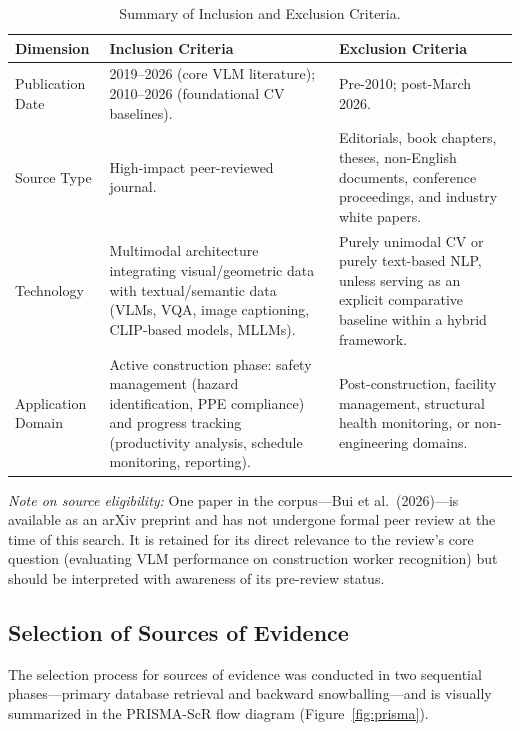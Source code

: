 \documentclass[10pt,letterpaper]{article}
\begin{document}
\begin{table}[H]
\caption{Summary of Inclusion and Exclusion Criteria.}
\label{tab:inclusion}
\small
{}
\begin{tabularx}{\textwidth}{L{2.6cm} Y Y}
\toprule
{}
\textbf{Dimension} & \textbf{Inclusion Criteria} & \textbf{Exclusion Criteria}\\
\midrule
Publication Date & 2019--2026 (core VLM literature); 2010--2026 (foundational CV baselines). & Pre-2010; post-March 2026. \\
Source Type & High-impact peer-reviewed journal. & Editorials, book chapters, theses, non-English documents, conference proceedings, and industry white papers. \\
Technology & Multimodal architecture integrating visual/geometric data with textual/semantic data (VLMs, VQA, image captioning, CLIP-based models, MLLMs). & Purely unimodal CV or purely text-based NLP, unless serving as an explicit comparative baseline within a hybrid framework. \\
Application Domain & Active construction phase: safety management (hazard identification, PPE compliance) and progress tracking (productivity analysis, schedule monitoring, reporting). & Post-construction, facility management, structural health monitoring, or non-engineering domains. \\
\bottomrule
\end{tabularx}
\end{table}

\textit{Note on source eligibility:} One paper in the corpus---Bui et al.\ (2026)---is available as an arXiv preprint and has not undergone formal peer review at the time of this search. It is retained for its direct relevance to the review's core question (evaluating VLM performance on construction worker recognition) but should be interpreted with awareness of its pre-review status.

\subsection{Selection of Sources of Evidence}

The selection process for sources of evidence was conducted in two sequential phases---primary database retrieval and backward snowballing---and is visually summarized in the PRISMA-ScR flow diagram (Figure~\ref{fig:prisma}).
\end{document}
